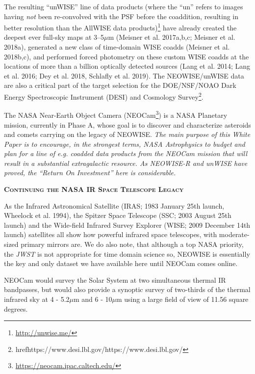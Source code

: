 \documentclass[12pt]{article}
\begin{document}
\smallskip 
\smallskip
\noindent
The resulting ``unWISE'' line of data products (where the ``un''
refers to images having {\it not} been re-convolved with the PSF
before the coaddition, resulting in better resolution than the AllWISE
data products)\footnote{\href{http://unwise.me/}{http://unwise.me/}}
have already created the deepest ever full-sky maps at 3–5$\mu$m
(Meisner et al. 2017a,b,c; Meisner et al. 2018a), generated a new
class of time-domain WISE coadds (Meisner et al.  2018b,c), and
performed forced photometry on these custom WISE coadds at the
locations of more than a billion optically detected sources (Lang et
al. 2014; Lang et al. 2016; Dey et al. 2018, Schlafly et
al. 2019). The NEOWISE/unWISE data are also a critical part of the
target selection for the DOE/NSF/NOAO Dark Energy Spectroscopic
Instrument (DESI) and Cosmology
Survey\footnote{href{https://www.desi.lbl.gov/}{https://www.desi.lbl.gov/}}.

\smallskip
\smallskip 
\noindent
The NASA Near-Earth Object Camera
(NEOCam\footnote{\href{https://neocam.ipac.caltech.edu/}{https://neocam.ipac.caltech.edu/}})
is a NASA Planetary mission, currently in Phase A, whose goal is to
discover and characterize asteroids and comets carrying on the legacy
of NEOWISE. {\it The main purpose of this White Paper is to encourage,
in the strongest terms, NASA Astrophysics to budget and plan for a
line of e.g. coadded data products from the NEOCam mission that will
result in a substantial extragalactic resource. As NEOWISE-R and
unWISE have proved, the ``Return On Investment'' here is
considerable.}


\smallskip
\smallskip
\noindent
{\bfseries \textsc{\textcolor{Cerulean}{Continuing the NASA IR Space Telescope Legacy}}} 

\smallskip
\noindent
As the Infrared Astronomical Satellite (IRAS; 1983 January 25th launch, Wheelock et al. 1994), the Spitzer Space Telescope (SSC; 2003 August 25th launch) and the Wide-field Infrared Survey Explorer (WISE; 2009 December 14th launch) satellites all show how powerful infrared space telescopes, with moderate-sized primary mirrors are. We do also note, that although a top NASA priority, the {\it JWST} is not appropriate for time domain science so, NEOWISE is essentially the key and only dataset we have available here until NEOCam comes online. 

\smallskip
\smallskip
\noindent
NEOCam would survey the Solar System at two simultaneous thermal IR
bandpasses, but would also provide a synoptic survey of two-thirds of
the thermal infrared sky at 4 - 5.2$\mu$m and 6 - 10$\mu$m using a
large field of view of 11.56 square degrees.
\end{document}
